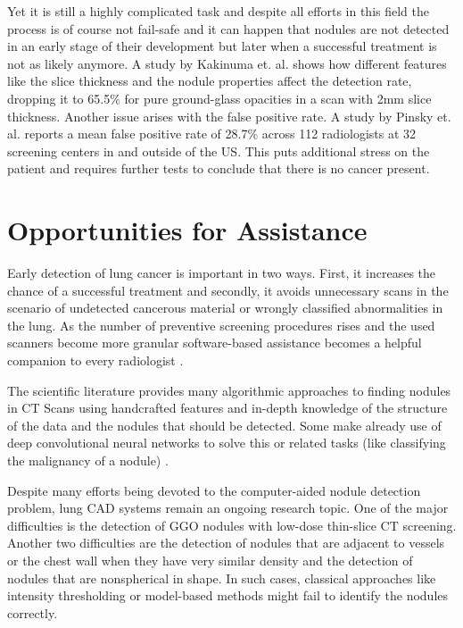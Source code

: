 \documentclass[main.tex]{subfiles}
\begin{document}
Yet it is still a highly complicated task and despite all efforts in this field the process is of course not fail-safe and it can happen that nodules are not detected in an early stage of their development but later when a successful treatment is not as likely anymore. A study by Kakinuma et. al.\cite{kakinuma2012comparison} shows how different features like the slice thickness and the nodule properties affect the detection rate, dropping it to 65.5$\%$ for pure ground-glass opacities in a scan with 2mm slice thickness. Another issue arises with the false positive rate. A study by Pinsky et. al.\cite{pinsky2013national} reports a mean false positive rate of 28.7$\%$ across 112 radiologists at 32 screening centers in and outside of the US. This puts additional stress on the patient and requires further tests to conclude that there is no cancer present.


\section{Opportunities for Assistance}

Early detection of lung cancer is important in two ways. First, it increases the chance of a successful treatment and secondly, it avoids unnecessary scans in the scenario of undetected cancerous material or wrongly classified abnormalities in the lung. As the number of preventive screening procedures rises and the used scanners become more granular software-based assistance becomes a helpful companion to every radiologist \cite{li2005computer}.

The scientific literature provides many algorithmic approaches to finding nodules in CT Scans \cite{armato1999computerized}\cite{armato2001automated}\cite{okada2005robust}\cite{tao2009multi}\cite{ye2009shape} using handcrafted features and in-depth knowledge of the structure of the data and the nodules that should be detected. Some make already use of deep convolutional neural networks to solve this or related tasks (like classifying the malignancy of a nodule) \cite{cheng2016computer}\cite{huang2017lung}\cite{shen2015multi}.

Despite many efforts being devoted to the computer-aided nodule detection problem, lung CAD systems remain an ongoing research topic. One of the major difficulties is the detection of GGO nodules with low-dose thin-slice CT screening. Another two difficulties are the detection of nodules that are adjacent to vessels or the chest wall when they have very similar density and the detection of nodules that are nonspherical in shape. In such cases, classical approaches like intensity thresholding or model-based methods might fail to identify the nodules correctly.
\end{document}
